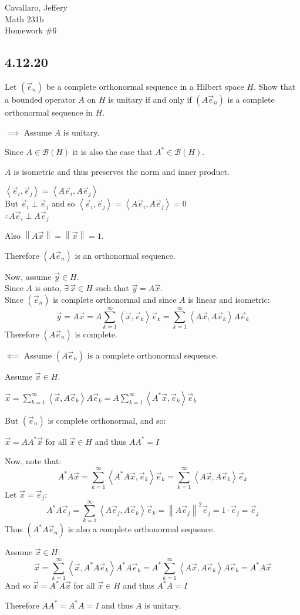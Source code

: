 \documentclass[letterpaper,12pt,fleqn]{article}
\newcommand{\ve}{\vec{e}}
\newcommand{\vx}{\vec{x}}
\newcommand{\vy}{\vec{y}}
\newcommand{\norm}[1]{\left\|#1\right\|}
\newcommand{\inner}[1]{\left<#1\right>}
\newcommand{\mb}{\mathcal{B}}
\begin{document}
Cavallaro, Jeffery \\
Math 231b \\
Homework \#6

\subsection*{4.12.20}

Let $(\ve_n)$ be a complete orthonormal sequence in a Hilbert space $H$. Show
that a bounded operator $A$ on $H$ is unitary if and only if $(A\ve_n)$ is a
complete orthonormal sequence in $H$.

\begin{description}
\item $\implies$ Assume $A$ is unitary.

  Since $A\in\mb(H)$ it is also the case that $A^*\in\mb(H)$.

  $A$ is isometric and thus preserves the norm and inner product.
  
  $\inner{\ve_i,\ve_j}=\inner{A\ve_i,A\ve_j}$ \\
  But $\ve_i\perp\ve_j$ and so $\inner{\ve_i,\ve_j}=\inner{A\ve_i,A\ve_j}=0$ \\
  $\therefore A\ve_i\perp A\ve_j$

  Also $\norm{A\vx}=\norm{\vx}=1$.

  Therefore $(A\ve_n)$ is an orthonormal sequence.

  Now, assume $\vy\in H$. \\
  Since $A$ is onto, $\exists\,\vx\in H$ such that $\vy=A\vx$. \\
  Since $(\ve_n)$ is complete orthonormal and since $A$ is linear and
  isometric:
  \[\vy=A\vx=A\sum_{k=1}^{\infty}\inner{\vx,\ve_k}\ve_k=
  \sum_{k=1}^{\infty}\inner{A\vx,A\ve_k}A\ve_k\]
  Therefore $(A\ve_n)$ is complete.

\item $\impliedby$ Assume $(A\ve_n)$ is a complete orthonormal sequence.

  Assume $\vx\in H$.

  $\vx=\sum_{k=1}^{\infty}\inner{\vx,A\ve_k}A\ve_k=
  A\sum_{k=1}^{\infty}\inner{A^*\vx,\ve_k}\ve_k$

  But $(\ve_n)$ is complete orthonormal, and so:

  $\vx=AA^*\vx$ for all $\vx\in H$ and thus $AA^*=I$

  Now, note that:
  \[A^*A\vx=\sum_{k=1}^{\infty}\inner{A^*A\vx,\ve_k}\ve_k=
  \sum_{k=1}^{\infty}\inner{A\vx,A\ve_k}\ve_k\]
  Let $\vx=\ve_j$:
  \[A^*A\ve_j=\sum_{k=1}^{\infty}\inner{A\ve_j,A\ve_k}\ve_k=
  \norm{A\ve_j}^2\ve_j=1\cdot\ve_j=\ve_j\]
  Thus $(A^*A\ve_n)$ is also a complete orthonormal sequence.

  Assume $\vx\in H$:
  \[\vx=\sum_{k=1}^{\infty}\inner{\vx,A^*A\ve_k}A^*A\ve_k=
  A^*\sum_{k=1}^{\infty}\inner{A\vx,A\ve_k}A\ve_k=A^*A\vx\]
  And so $\vx=A^*A\vx$ for all $\vx\in H$ and thus $A^*A=I$

  Therefore $AA^*=A^*A=I$ and thus $A$ is unitary.
\end{description}
\end{document}
